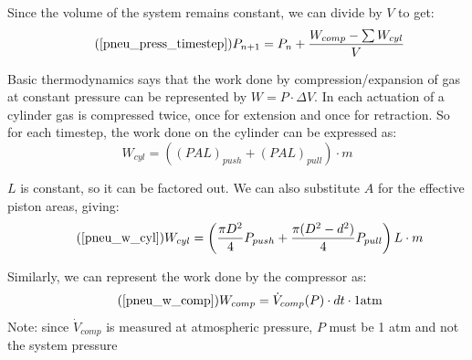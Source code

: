 \documentclass[11pt,a4paper,titlepage]{article}
\begin{document}
	Since the volume of the system remains constant, we can divide by $V$ to get:
	\begin{equation} \tag{\ref*{pneu_press_timestep}}
		P_{n+1} = P_n + \frac{W_{comp} - \sum W_{cyl}}{V}
	\end{equation}
	
	Basic thermodynamics says that the work done by compression/expansion of gas at constant pressure can be represented by $W = P \cdot \Delta V$. In each actuation of a cylinder gas is compressed twice, once for extension and once for retraction. So for each timestep, the work done on the cylinder can be expressed as:
	\begin{equation}
		W_{cyl} = ((PAL)_{push} + (PAL)_{pull}) \cdot m
	\end{equation}
	
	$L$ is constant, so it can be factored out. We can also substitute $A$ for the effective piston areas, giving:
	\begin{equation} \tag{\ref*{pneu_w_cyl}}
		W_{cyl} = \left( \frac{\pi D^2}{4} P_{push} + \frac{\pi (D^2 - d^2)}{4} P_{pull} \right) L \cdot m
	\end{equation}
	
	Similarly, we can represent the work done by the compressor as:
	\begin{equation} \tag{\ref*{pneu_w_comp}}
		W_{comp} = \dot{V}_{comp}(P) \cdot dt \cdot 1 \text{atm}
	\end{equation}
	Note: since $\dot{V}_{comp}$ is measured at atmospheric pressure, $P$ must be 1 atm and not the system pressure
	
\end{document}
